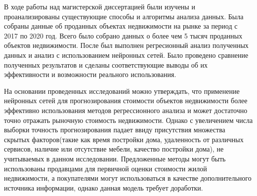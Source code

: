 


В ходе работы над магистерской диссертацией были изучены и проанализированы существующие способы и алгоритмы анализа
данных. Была собраны данные об проданных объектах недвижимости на рынке за период с 2017 по 2020 год.
Всего было собрано данных о более чем 5 тысяч проданных объектов недвижимости. После был выполнен регресионный анализ
полученных данных и анализ с использованием нейронных сетей. Было проведено сравнение полученных результатов и сделаны
соответствующие выводы об их эффективности и возможности реального использования.

На основании проведенных исследований можно утверждать, что применение нейронных сетей для прогнозирования
стоимости объектов недвижимости более эффективно использования методов регрессионного анализа и может достаточно
точно отражать рыночную стоимость недвижимости. Однако с увеличением числа выборки точность прогнозирования падает ввиду
присутствия множества скрытых факторов(такие как время постройки дома, удаленность от различных сервисов, наличие или
отсутствие мебели, качество постройки дома), не учитываемых в данном исследовании.
Предложенные методы могут быть использованы продавцами для первичной оценки стоимости жилой недвижимости,
а покупателями могут использоваться в качестве дополнительного источника информации, однако данная модель требует
доработки.
